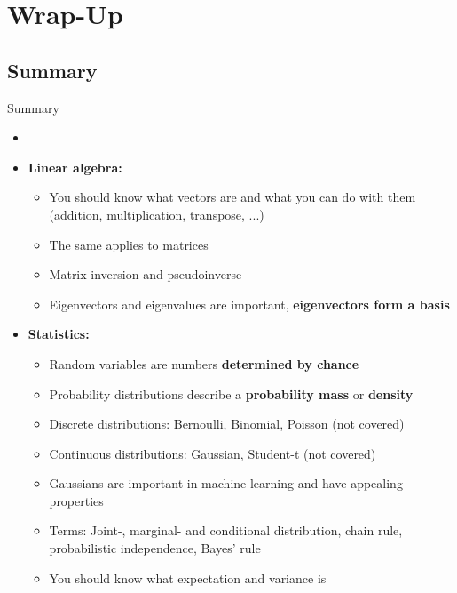 \section{Wrap-Up}

\subsection{Summary}

\begin{frame}[allowframebreaks]{Summary}{}
	\begin{itemize}
		\item {}
		\item \textbf{Linear algebra:}
		\begin{itemize}
			\item You should know what vectors are and what you can do with them \\
				(addition, multiplication, transpose, ...)
			\item The same applies to matrices
			\item Matrix inversion and pseudoinverse
			\item Eigenvectors and eigenvalues are important, \textbf{eigenvectors form a basis}
		\end{itemize}
		\framebreak
		\item \textbf{Statistics:}
		\begin{itemize}
			\item Random variables are numbers \textbf{determined by chance}
			\item Probability distributions describe a \textbf{probability mass} or \textbf{density}
			\item Discrete distributions: Bernoulli, Binomial, Poisson (not covered)
			\item Continuous distributions: Gaussian, Student-t (not covered)
			\item Gaussians are important in machine learning and have appealing properties
			\item Terms: Joint-, marginal- and conditional distribution, chain rule, probabilistic independence, Bayes' rule
			\item You should know what expectation and variance is
		\end{itemize}

\end{itemize}
\end{frame}
